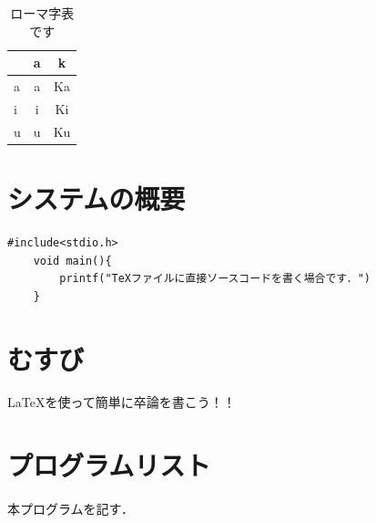 \begin{table}[htbp]
    \centering
    \caption{ローマ字表です}
    \label{tab:Romazi}
    \begin{tabular}{l|cc}
      & a & k  \\ \hline
    a & a & Ka \\
    i & i & Ki \\
    u & u & Ku
    \end{tabular}
\end{table}

\chapter{システムの概要}
\label{sec:4}
\begin{lstlisting}[caption=UUIDの変更関数,label=ChangeUUID, firstnumber=1]
    #include<stdio.h>
    void main(){
        printf("TeXファイルに直接ソースコードを書く場合です．")
    }
\end{lstlisting}


\chapter{むすび}
LaTeXを使って簡単に卒論を書こう！！


\clearpage
{}


\Appendix
\chapter{プログラムリスト}
本プログラムを記す．

